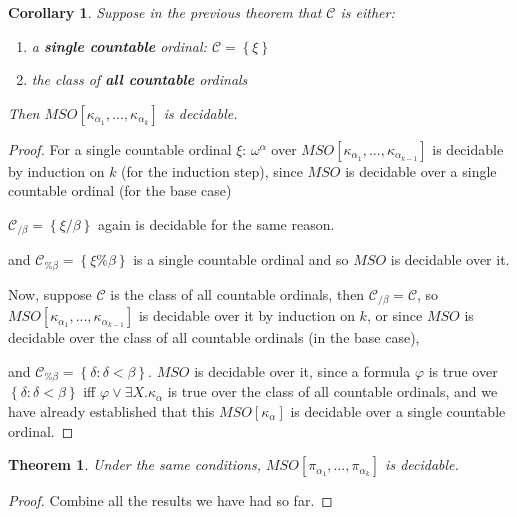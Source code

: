 \documentclass{article}
\newtheorem{theorem}{Theorem}
\newtheorem{corollary}{Corollary}
\newcommand{\brackets}[1]{\left[ {#1} \right]}
\newcommand{\braces}[1]{\left\{ {#1} \right\}}
\newcommand{\setcomp}[1]{\braces{#1}}
\newcommand{\kk}[1]{{\kappa}_{#1}}
\newcommand{\pp}[1]{{\pi}_{#1}}
\newcommand{\CC}{\mathcal{C}}
\begin{document}
\begin{corollary}
    Suppose in the previous theorem that $\CC$ is either:
    \begin{enumerate}
        \item a \textbf{single countable} ordinal: $\CC = \setcomp{\xi}$
        \item the class of \textbf{all countable} ordinals
    \end{enumerate}
    Then $MSO \brackets{\kk{\alpha_1}, ..., \kk{\alpha_k}}$ is decidable.
\end{corollary}

\begin{proof}
    For a single countable ordinal $\xi$:
    $\omega^\alpha$ over $MSO \brackets{\kk{\alpha_1}, ..., \kk{\alpha_{k-1}}}$
    is decidable by induction on $k$ (for the induction step),
    since $MSO$ is decidable over a single countable ordinal (for the base case)

    $\CC_{/\beta} = \setcomp{\xi/\beta}$ again is decidable for the same reason.

    and $\CC_{\% \beta} = \setcomp{\xi \% \beta}$ 
    is a single countable ordinal and so $MSO$ is decidable over it.


    Now, suppose $\CC$ is the class of all countable ordinals,
    then $\CC_{/ \beta} = \CC$,
    so $MSO \brackets{\kk{\alpha_1}, ..., \kk{\alpha_{k-1}}}$ is decidable
    over it by induction on $k$, or since $MSO$ is decidable over
    the class of all countable ordinals (in the base case),

    and $\CC_{\% \beta} = \setcomp{\delta : \delta < \beta}$.
    $MSO$ is decidable over it, since a formula
    $\varphi$ is true over $\setcomp{\delta : \delta < \beta}$
    iff $\varphi \vee \exists X. \kk{\alpha}$ is true over the class
    of all countable ordinals, and we have already established that
    this $MSO \brackets{\kk{\alpha}}$ is decidable over a single countable ordinal.
\end{proof}

\begin{theorem}
    Under the same conditions, $MSO \brackets{\pp{\alpha_1}, ..., \pp{\alpha_k}}$ is decidable.
\end{theorem}

\begin{proof}
    Combine all the results we have had so far.
\end{proof}
\end{document}

